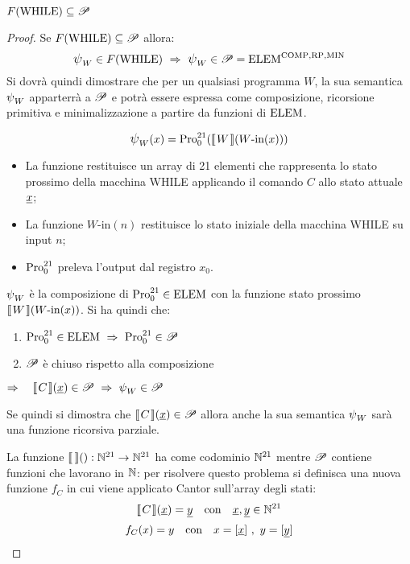 \begin{theorem}
    $F(\text{WHILE}) \subseteq \mathscr{P}$
\end{theorem}
\begin{proof}
    Se $F(\text{WHILE}) \subseteq \mathscr{P}$ allora:
    $$ \semWHILE_W\in F(\text{WHILE})\ \Rightarrow\ \semWHILE_W
    \in\ricPar = \elem^{\comp,\RP,\MIN}$$
    Si dovrà quindi dimostrare che per un qualsiasi programma $W$, la sua semantica
    $\semWHILE_W$ apparterrà a $\mathscr{P}$ e potrà essere espressa come
    composizione, ricorsione primitiva e minimalizzazione a partire da funzioni di
    $\text{ELEM}$.

    $$ \semWHILE_W(x) = \Pro_0^{21}(\opsemWHILE{W}{W\text{-in}(x)}) $$
    \begin{itemize}
        \item La funzione  restituisce un array di 21
            elementi che rappresenta lo stato prossimo della macchina WHILE applicando
            il comando $C$ allo stato attuale $\text{\underline{$x$}}$;
        \item La funzione $W\text{-in}(n)$ restituisce lo stato iniziale della
            macchina WHILE su input $n$;
        \item $\text{Pro}_0^{21}$ preleva l'output dal registro $x_0$.
    \end{itemize}
    $\semWHILE_W$ è la composizione di $\text{Pro}_0^{21}\in\text{ELEM}$ con la funzione
    stato prossimo $\opsemWHILE{W}{W\text{-in}(x)}$. Si ha quindi che:

    \begin{minipage}{.5\textwidth}
    \begin{enumerate}
        \item $\Pro_0^{21}\in\elem \ \Rightarrow \ \Pro_0^{21}\in\ricPar$
        \item $\mathscr{P}$ è chiuso rispetto alla composizione
    \end{enumerate}
    \end{minipage}
    \begin{minipage}{.4\textwidth}
        $\Rightarrow \quad \opsemWHILE{C}{\sottolinea{x}}\in\ricPar \ \Rightarrow \ 
        \semWHILE_W\in\ricPar$
    \end{minipage}

    Se quindi si dimostra che $\opsemWHILE{C}{\sottolinea{x}}\in\ricPar$ allora anche
    la sua semantica $\semWHILE_W$ sarà una funzione ricorsiva parziale.

    La funzione $\opsemWHILE{}{}:\N^{21}\to\N^{21}$ ha come codominio $\mathbb{N}^{21}$ mentre
    $\mathscr{P}$ contiene funzioni che lavorano in $\mathbb{N}$: per risolvere questo problema
    si definisca una nuova funzione $f_C$ in cui viene applicato Cantor sull'array 
    degli stati:
    $$ \opsemWHILE{C}{\sottolinea{x}} = \sottolinea{y} \quad \text{con }
     \ \ \sottolinea{x},\sottolinea{y}\in\N^{21}$$
    $$ f_C(x)=y \quad \text{con }
     \ \ x=[\text{\underline{$x$}}]\ ,\ y=[\text{\underline{$y$}}]$$
    

\end{proof}
